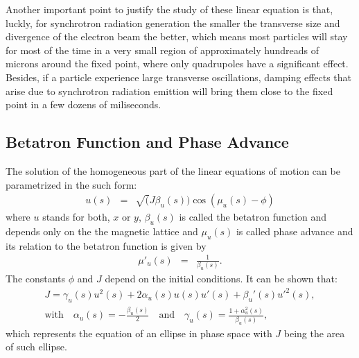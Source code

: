 \documentclass[
	12pt,				%
	openright,			%
	oneside,			%
	a4paper,		%
	chapter=TITLE,		%
	section=TITLE,		%
    brazil,				%
	english,			%
	sumario=tradicional,
	]{abntex2}
\begin{document}
	Another important point to justify the study of these linear equation is that, luckly, for synchrotron radiation generation the smaller the transverse size and divergence of the electron beam the better, which means most particles will stay for most of the time in a very small region of approximately hundreads of microns around the fixed point, where only quadrupoles have a significant effect. Besides, if a particle experience large transverse oscillations, damping effects that arise due to synchrotron radiation emittion will bring them close to the fixed point in a few dozens of miliseconds.


    \subsection{Betatron Function and Phase Advance}

	The solution of the homogeneous part of the linear equations of motion can be parametrized in the such form:
	\begin{align} \label{eq:betatron_motion}
		u(s) &=& \sqrt(J\beta_u(s)) \cos(\mu_u(s) - \phi)
	\end{align}
	where $u$ stands for both, $x$ or $y$, $\beta_u(s)$ is called the betatron function and depends only on the the magnetic lattice and $\mu_u(s)$ is called phase advance and its relation to the betatron function is given by
	\begin{align}
		\mu'_u(s) &=& \frac{1}{\beta_u(s)}.
	\end{align}
	The constants $\phi$ and $J$ depend on the initial conditions. It can be shown that:
	\begin{align}
		&J = \gamma_u(s)u^2(s) + 2\alpha_u(s)u(s)u'(s) + \beta_u'(s)u'^2(s),& \\
        &\text{with} \quad \alpha_u(s) = -\frac{\beta_u(s)}{2} \quad \text{and} \quad \gamma_u(s) = \frac{1+\alpha_u^2(s)}{\beta_u(s)},&
	\end{align}
	which represents the equation of an ellipse in phase space with $J$ being the area of such ellipse.
\end{document}
